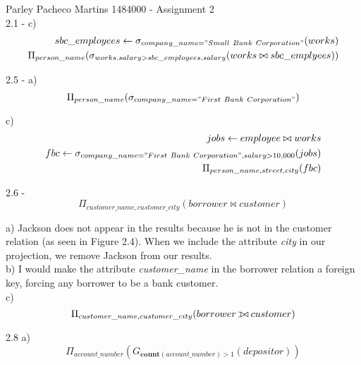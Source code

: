 \documentclass{book}
\def\ojoin{\setbox0=\hbox{$\bowtie$}%
  \rule[-.02ex]{.25em}{.4pt}\llap{\rule[\ht0]{.25em}{.4pt}}}
\def\leftouterjoin{\mathbin{\ojoin\mkern-5.8mu\bowtie}}
\begin{document}
Parley Pacheco Martins 1484000 - Assignment 2 \\

2.1 - c) 
	\begin{equation}
	\begin{split}
		sbc\_employees \leftarrow \sigma_{company\_name = "Small\ Bank\ Corporation"} (works)\\
		\Pi_{person\_name} (\sigma_{works.salary > sbc\_employees.salary}(works \bowtie sbc\_emplyees))
	\end{split}
	\end{equation}

2.5 - a)
	\begin{equation}
		\Pi_{person\_name} (\sigma_{company\_name = "First\ Bank\ Corporation"})
	\end{equation}

	c)
	\begin{equation}
	\begin{split}
		jobs \leftarrow employee \bowtie works \\
		fbc \leftarrow \sigma_{company\_name = "First\ Bank\ Corporation", salary > 10,000}(jobs) \\
		\Pi_{person\_name, street, city} (fbc)
	\end{split}
	\end{equation}

2.6 - \begin{equation}
		\Pi_{customer\_name, customer\_city}(borrower \bowtie customer)
	\end{equation}

a) Jackson does not appear in the results because he is not in the customer relation (as seen in 
Figure 2.4). When we include the attribute \textit{city} in our projection, we remove Jackson from our results. \\

b) I would make the attribute \textit{customer\_name} in the borrower relation a foreign key, forcing any borrower to be a bank customer. \\

c)\begin{equation}
		\Pi_{customer\_name, customer\_city}(borrower \leftouterjoin customer)
	\end{equation} 


2.8 a)
	\begin{equation}
		\Pi_{account\_number} (G_{\textbf{count}(account\_number) > 1} (depositor))
	\end{equation}
\end{document}
